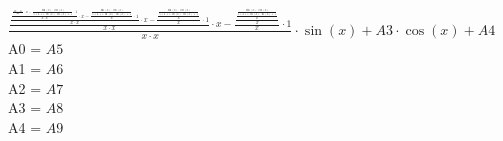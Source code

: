 \documentclass[12pt]{article}
\begin{document}
$\frac{\frac{\frac{\frac{\frac{A0 - A1}{A2} \cdot x - \frac{\sin(x) \cdot \cos(x)}{5 + 4 \cdot 1 + \ln(x) \cdot \ln(x) \cdot 1 \cdot 1} \cdot 1}{x \cdot x} \cdot x - \frac{\frac{\sin(x) \cdot \cos(x)}{5 + 4 \cdot 1 + \ln(x) \cdot \ln(x) \cdot 1 \cdot 1}}{x} \cdot 1}{x \cdot x} \cdot x - \frac{\frac{\frac{\sin(x) \cdot \cos(x)}{5 + 4 \cdot 1 + \ln(x) \cdot \ln(x) \cdot 1 \cdot 1}}{x}}{x} \cdot 1}{x \cdot x} \cdot x - \frac{\frac{\frac{\frac{\sin(x) \cdot \cos(x)}{5 + 4 \cdot 1 + \ln(x) \cdot \ln(x) \cdot 1 \cdot 1}}{x}}{x}}{x} \cdot 1}{x \cdot x} \cdot \sin(x) + A3 \cdot \cos(x) + A4$ \\ 
A0 = $A5$ \\ 
A1 = $A6$ \\ 
A2 = $A7$ \\ 
A3 = $A8$ \\ 
A4 = $A9$ \\ 
\end{document}
